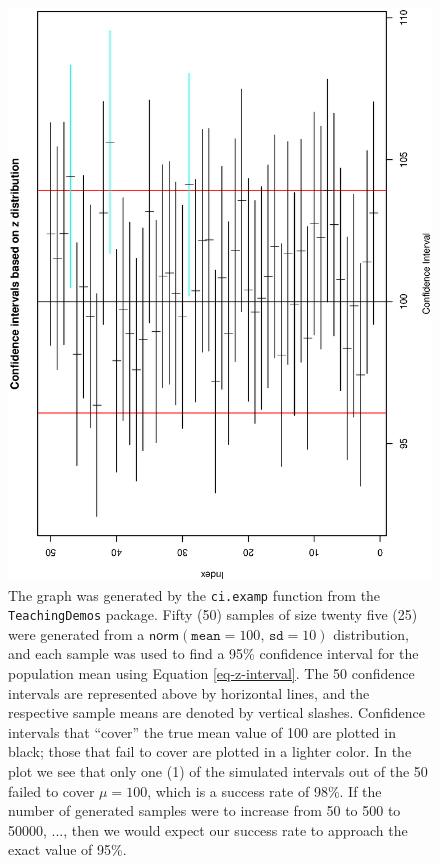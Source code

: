 \documentclass[captions=tableheading]{scrbook}
\begin{document}
\begin{figure}[th]
  \includegraphics[angle=270, totalheight=4in]{ps/estimate/ci-examp.ps}
  \caption[Simulated confidence intervals]{\small The graph was generated by the \texttt{ci.examp} function from the \texttt{TeachingDemos} package. Fifty (50) samples of size twenty five (25) were generated from a \( \mathsf{norm}(\mathtt{mean}=100,\,\mathtt{sd}=10) \) distribution, and each sample was used to find a 95\% confidence interval for the population mean using Equation \ref{eq-z-interval}. The 50 confidence intervals are represented above by horizontal lines, and the respective sample means are denoted by vertical slashes. Confidence intervals that ``cover'' the true mean value of 100 are plotted in black; those that fail to cover are plotted in a lighter color. In the plot we see that only one (1) of the simulated intervals out of the 50 failed to cover \(\mu=100\), which is a success rate of 98\%. If the number of generated samples were to increase from 50 to 500 to 50000, ..., then we would expect our success rate to approach the exact value of 95\%.}
  \label{fig-ci-examp}
\end{figure}
\end{document}
